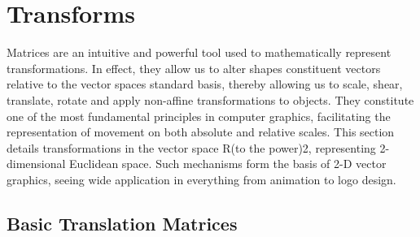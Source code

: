 \documentclass[10pt,a4paper]{article}
\begin{document}
\section{Transforms}

Matrices are an intuitive and powerful tool used to mathematically represent transformations. In effect, they allow us to alter shapes constituent vectors relative to the vector spaces standard basis, thereby allowing us to scale, shear, translate, rotate and apply non-affine transformations to objects. They constitute one of the most fundamental principles in computer graphics, facilitating the representation of movement on both absolute and relative scales. 
This section details transformations in the vector space R(to the power)2, representing 2-dimensional Euclidean space. Such mechanisms form the basis of 2-D vector graphics, seeing wide application in everything from animation to logo design. 


\subsection{Basic Translation Matrices}
\end{document}
